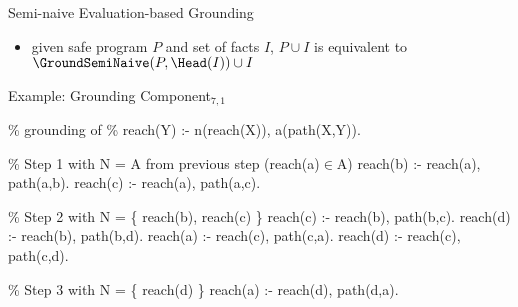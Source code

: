 \begin{frame}{Semi-naive Evaluation-based Grounding}
  \vfill
  \begin{itemize}
    \item given safe program \(P\) and set of facts \(I\), \(P \cup I\) is equivalent to \(\GroundSemiNaive(P,\Head(I)) \cup I\)
  \end{itemize}
\end{frame}

\begin{frame}[fragile]{Example: Grounding Component\(_{7,1}\)}
\vfill
\begin{SemiVerbatim}[\small]{.9}
{\color{comment}\% grounding of
\% reach(Y) :- {n(reach(X))}, a(path(X,Y)).}

{\color{comment}\% Step 1 with N = A from previous step (reach(a)\({}\in{}\)A)}
\alert{reach(b)} :- \alert{reach(a)}\only<1>{)}, path(a,b).
\alert{reach(c)} :- \alert{reach(a)}, path(a,c).

{\color{comment}\% Step 2 with N = \{ reach(b), reach(c) \}}
reach(c) :- \alert{reach(b)}\only<1>{)}, path(b,c).
\alert{reach(d)} :- \alert{reach(b)}, path(b,d).
reach(a) :- \alert{reach(c)}, path(c,a).
\alert{reach(d)} :- \alert{reach(c)}, path(c,d).

{\color{comment}\% Step 3 with N = \{ reach(d) \}}
reach(a) :- \alert{reach(d)}\only<1>{)}, path(d,a).

\end{SemiVerbatim}
\end{frame}

